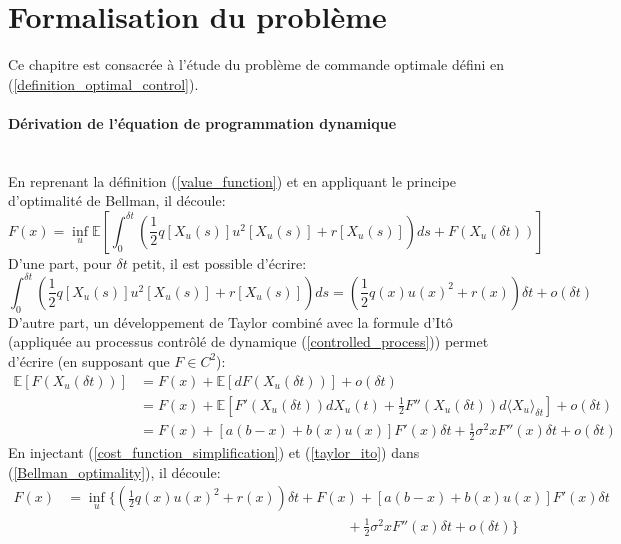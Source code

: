 \label{sec:Optimal_Control}

\section{Formalisation du problème}
Ce chapitre est consacrée à l'étude du problème de commande optimale défini en (\ref{definition_optimal_control}).
\paragraph{Dérivation de l'équation de programmation dynamique}\phantom{}\\
En reprenant la définition (\ref{value_function}) et en appliquant le principe d'optimalité de Bellman, il découle:
\begin{equation}\label{Bellman_optimality}
        F(x) = \inf_u\mathds{E}\left[\int_0^{\delta t}\left(\frac{1}{2}q\left[X_u(s)\right]u^2\left[X_u(s)\right]+r\left[X_u(s)\right]\right)ds+F(X_u(\delta t))\right]
\end{equation}
D'une part, pour $\delta t$ petit, il est possible d'écrire:
\begin{equation}\label{cost_function_simplification}
    \int_0^{\delta t}\left(\frac{1}{2}q\left[X_u(s)\right]u^2\left[X_u(s)\right]+r\left[X_u(s)\right]\right)ds=\left(\frac{1}{2}q(x){u(x)}^2+r(x)\right)\delta t+o(\delta t)
\end{equation}
D'autre part, un développement de Taylor combiné avec la formule d'Itô~\cite{ito1944} (appliquée au processus contrôlé de dynamique (\ref{controlled_process})) permet d'écrire (en supposant que $F\in C^2$):
\begin{equation}\label{taylor_ito}
    \begin{aligned}
        \mathds{E}[F(X_u(\delta t))]&=F(x)+\mathds{E}[dF(X_u(\delta t))]+o(\delta t)\\
        &=F(x)+\mathds{E}\left[F'(X_u(\delta t))dX_u(t)+\frac{1}{2}F''(X_u(\delta t))d\langle X_u\rangle_{\delta t} \right]+o(\delta t)\\
        &=F(x)+\left[a(b-x)+b(x)u(x)\right]F'(x)\delta t+\frac{1}{2}\sigma^2xF''(x)\delta t+o(\delta t)
    \end{aligned}
\end{equation}
En injectant (\ref{cost_function_simplification}) et (\ref{taylor_ito}) dans (\ref{Bellman_optimality}), il découle:
\begin{equation}\label{initial_minimisation problem}
    \begin{aligned}
        F(x)&=\inf_u\Bigg\{\left(\frac{1}{2}q(x){u(x)}^2+r(x)\right)\delta t+F(x)+\left[a(b-x)+b(x)u(x)\right]F'(x)\delta t\\&\quad\quad\quad\quad\quad\quad\quad\quad\quad\quad\quad\quad\quad\quad\quad\quad\quad\quad\quad\quad+\frac{1}{2}\sigma^2xF''(x)\delta t+o(\delta t)\Bigg\}
    \end{aligned}
\end{equation}

